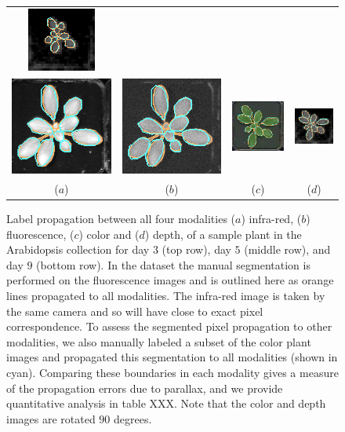 \begin{figure}[t]
\begin{centering}
\begin{tabular}{cccc}
\includegraphics[width=.15\textwidth]{Figures/LabelAlignment/day_5_hour_23-seg_depth.png}\\
\includegraphics[width=.15\textwidth]{Figures/LabelAlignment/day_9_hour_20-seg_ir.png}&
\includegraphics[width=.15\textwidth]{Figures/LabelAlignment/day_9_hour_20-seg_fmp.png}&
\includegraphics[width=.15\textwidth]{Figures/LabelAlignment/day_9_hour_20-seg_rgb.png}&
\includegraphics[width=.15\textwidth]{Figures/LabelAlignment/day_9_hour_20-seg_depth.png}\\
($a$) & ($b$) & ($c$) & ($d$) \\
\end{tabular}
\caption{Label propagation between all four modalities ($a$) infra-red, ($b$) fluorescence, ($c$) color and ($d$) depth, of a sample plant in the Arabidopsis collection for day $3$ (top row), day $5$ (middle row), and day $9$ (bottom row).  In the dataset the manual segmentation is performed on the fluorescence images and is outlined here as orange lines propagated to all modalities.  The infra-red image is taken by the same camera and so will have close to exact pixel correspondence.  To assess the segmented pixel propagation to other modalities, we also manually labeled a subset of the color plant images and propagated this segmentation to all modalities (shown in cyan).  Comparing these boundaries in each modality gives a measure of the propagation errors due to parallax, and we provide quantitative analysis in table XXX.  Note that the color and depth images are rotated $90$ degrees.}
\label{fig:LabelAlignment}
\end{centering}
\end{figure}


